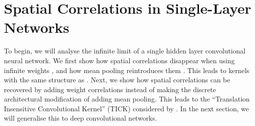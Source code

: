 \documentclass{article}
\theoremstyle{definition}
\begin{document}


\section{Spatial Correlations in Single-Layer Networks}
To begin, we will analyse the infinite limit of a single hidden layer
convolutional neural network. We first show how spatial correlations disappear
when using infinite weights \citep{garriga2018infiniteconv,novak2019infiniteconv}, and how mean pooling reintroduces them \citep{novak2019infiniteconv}. This leads to kernels with the same structure as . Next, we show how spatial correlations can be recovered by adding weight correlations instead of making the discrete architectural modification of adding mean pooling. This leads to the 
``Translation Insensitive Convolutional Kernel'' (TICK) considered by \citet{dutordoir2020}. In the next section, we will generalise this to deep convolutional networks.
\end{document}
